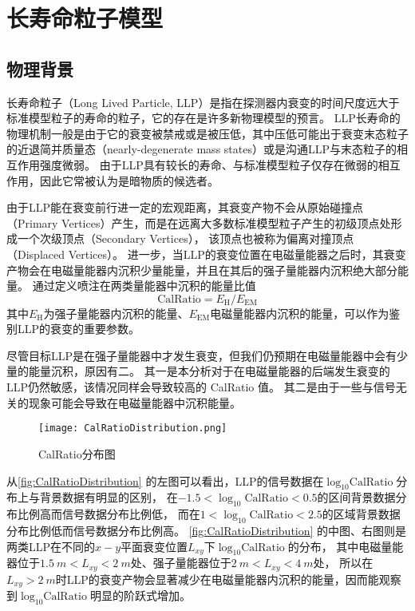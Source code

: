 
\chapter{长寿命粒子模型}

\section{物理背景}
长寿命粒子（Long Lived Particle, LLP）是指在探测器内衰变的时间尺度远大于标准模型粒子的寿命的粒子，它的存在是许多新物理模型的预言。
LLP长寿命的物理机制一般是由于它的衰变被禁戒或是被压低，其中压低可能出于衰变末态粒子的近退简并质量态（nearly-degenerate mass states）或是沟通LLP与末态粒子的相互作用强度微弱。
由于LLP具有较长的寿命、与标准模型粒子仅存在微弱的相互作用，因此它常被认为是暗物质的候选者。

由于LLP能在衰变前行进一定的宏观距离，其衰变产物不会从原始碰撞点（Primary Vertices）产生，而是在远离大多数标准模型粒子产生的初级顶点处形成一个次级顶点（Secondary Vertices），
该顶点也被称为偏离对撞顶点（Displaced Vertices）。
进一步，当LLP的衰变位置在电磁量能器之后时，其衰变产物会在电磁量能器内沉积少量能量，并且在其后的强子量能器内沉积绝大部分能量。
通过定义喷注在两类量能器中沉积的能量比值$$\text{CalRatio}=E_{\text{H}}/E_{\text{EM}}$$
其中$E_{\text{H}}$为强子量能器内沉积的能量、$E_{\text{EM}}$电磁量能器内沉积的能量，可以作为鉴别LLP的衰变的重要参数。\cite{calratio}

尽管目标LLP是在强子量能器中才发生衰变，但我们仍预期在电磁量能器中会有少量的能量沉积，原因有二。
其一是本分析对于在电磁量能器的后端发生衰变的LLP仍然敏感，该情况同样会导致较高的 CalRatio 值。
其二是由于一些与信号无关的现象可能会导致在电磁量能器中沉积能量。

\begin{figure}[ht]
    \centering
    \texttt{[image: CalRatioDistribution.png]}
    \caption{CalRatio分布图}
    \label{fig:CalRatioDistribution}
\end{figure}

从\autoref{fig:CalRatioDistribution} 的左图可以看出，LLP的信号数据在$\log_{10}\text{CalRatio}$分布上与背景数据有明显的区别，
在$-1.5<\log_{10}\text{CalRatio}<0.5$的区间背景数据分布比例高而信号数据分布比例低，
而在$1<\log_{10}\text{CalRatio}<2.5$的区域背景数据分布比例低而信号数据分布比例高。
\autoref{fig:CalRatioDistribution} 的中图、右图则是两类LLP在不同的$x-y$平面衰变位置$L_{xy}$下$\log_{10}\text{CalRatio}$的分布，
其中电磁量能器位于$\SI{1.5}{m} < L_{xy} < \SI{2}{m}$处、强子量能器位于$\SI{2}{m} < L_{xy} < \SI{4}{m}$处，
所以在$L_{xy} > \SI{2}{m}$时LLP的衰变产物会显著减少在电磁量能器内沉积的能量，因而能观察到$\log_{10}\text{CalRatio}$明显的阶跃式增加。

